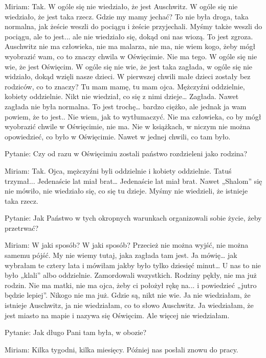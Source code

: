 Miriam: Tak. W ogóle się nie wiedziało, że jest Auschwitz. W ogóle się nie wiedziało, że jest taka rzecz. Gdzie my mamy jechać? To nie była droga, taka normalna, jak żeście weszli do pociągu i żeście przyjechali. Myśmy także weszli do pociągu, ale to jest...  ale nie wiedziało się, dokąd oni nas wiozą. To jest zgroza. Auschwitz nie ma człowieka, nie ma malarza, nie ma, nie wiem kogo, żeby mógł wyobrazić wam, co to znaczy chwila w Oświęcimie. Nie ma tego. W ogóle się nie wie, że jest Oświęcim. W ogóle się nie wie, że jest taka zagłada, w ogóle się nie widziało, dokąd wzięli nasze dzieci. W pierwszej chwili małe dzieci zostały bez rodziców, co to znaczy? Tu mam mamę, tu mam ojca. Mężczyźni oddzielnie, kobiety oddzielnie. Nikt nie wiedział, co się z nimi dzieje… Zagłada. Nawet zagłada nie była normalna. To jest trochę… bardzo ciężko, ale jednak ja wam powiem, że to jest.. Nie wiem, jak to wytłumaczyć. Nie ma człowieka, co by mógł wyobrazić chwile w Oświęcimie, nie ma. Nie w książkach, w niczym nie można opowiedzieć, co było w Oświęcimie. Nawet w jednej chwili, co tam było. 

 

Pytanie: Czy od razu w Oświęcimiu zostali państwo rozdzieleni jako rodzina? 

Miriam: Tak. Ojca, mężczyźni byli oddzielnie i kobiety oddzielnie. Tatuś trzymał... Jedenaście lat miał brat… Jedenaście lat miał brat. Nawet „Shalom” się nie mówiło, nie wiedziało się, co się tu dzieje. Myśmy nie wiedzieli, że istnieje taka rzecz. 

 

Pytanie: Jak Państwo w tych okropnych warunkach organizowali sobie życie, żeby przetrwać? 

Miriam: W jaki sposób? W jaki sposób? Przecież nie można wyjść, nie można samemu pójść. My nie wiemy tutaj, jaka zagłada tam jest. Ja mówię… jak wybrałam te cztery lata i mówiłam jakby było tylko dziesięć minut… U nas to nie było „klali” albo oddzielnie. Zamordowali wszystkich. Rodziny pękły, nie ma już rodzin. Nie ma matki, nie ma ojca, żeby ci położył rękę na... i powiedzieć „jutro będzie lepiej”. Nikogo nie ma już. Gdzie są, nikt nie wie. Ja nie wiedziałam, że istnieje Auschwitz, ja nie wiedziałam, co to słowo Auschwitz. Ja wiedziałam, że jest miasto na mapie i nazywa się Oświęcim. Ale więcej nie wiedziałam. 

 

Pytanie: Jak długo Pani tam była, w obozie? 

Miriam: Kilka tygodni, kilka miesięcy. Później nas posłali znowu do pracy. 

